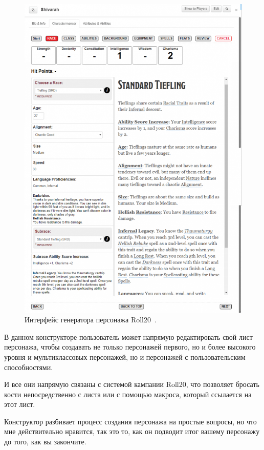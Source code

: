 \begin{figure}[H]
    \centering
    \includegraphics[scale=0.45]{Roll20.png}
    \caption{Интерфейс генератора персонажа Roll20~\cite{roll20}.}
    \label{fig:roll20}
\end{figure}

В данном конструкторе пользователь может напрямую редактировать свой лист персонажа, чтобы создавать не только персонажей первого, но и более высокого уровня и мультиклассовых персонажей, но и персонажей с пользовательским способностями.

И все они напрямую связаны с системой кампании Roll20, что позволяет бросать кости непосредственно с листа или с помощью макроса, который ссылается на этот лист.

Конструктор разбивает процесс создания персонажа на простые вопросы, но что мне действительно нравится, так это то, как он подводит итог вашему персонажу до того, как вы закончите.

